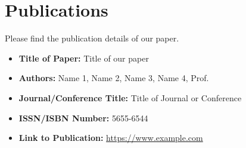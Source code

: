 \chapter*{Publications}
Please find the publication details of our paper.

\begin{itemize}
	\item \textbf{Title of Paper:} Title of our paper
	\item \textbf{Authors:} Name 1, Name 2, Name 3, Name 4, Prof. 
	\item \textbf{Journal/Conference Title:} Title of Journal or Conference
	\item \textbf{ISSN/ISBN Number:} 5655-6544
	\item \textbf{Link to Publication:} \url{https://www.example.com}
	
\end{itemize}


